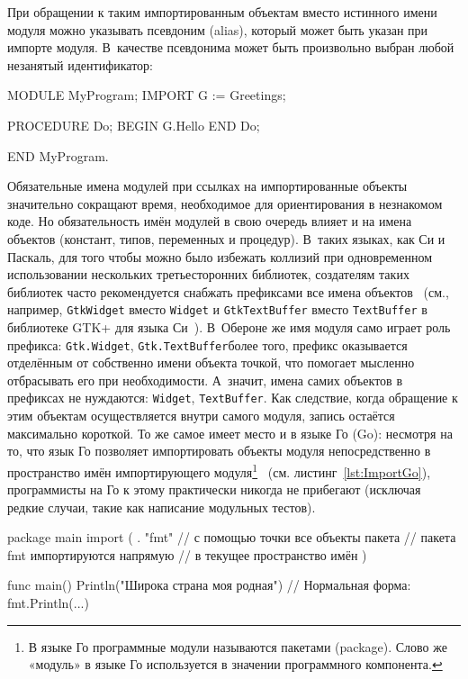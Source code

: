 \documentclass[utf8]{lgu}
\newcommand{\tire}{\unskip\nobreak\thinspace\textemdash\thinspace}
\newcommand{\code}[1]{{\normalsize\texttt{#1}}}
\begin{document}
При обращении к таким импортированным объектам вместо истинного имени модуля можно указывать псевдоним (alias), который может быть указан при импорте модуля. В~качестве псевдонима может быть произвольно выбран любой незанятый идентификатор:

\begin{listing}[H]
\caption{Указание псевдонима при импорте модуля}
\vspace{-17pt}
\begin{modula2}
MODULE MyProgram;
  IMPORT G := Greetings;

  PROCEDURE Do;
  BEGIN
    G.Hello
  END Do;

END MyProgram.
\end{modula2}
\end{listing}

Обязательные имена модулей при ссылках на импортированные объекты значительно сокращают время, необходимое для ориентирования в незнакомом коде. Но обязательность имён модулей в свою очередь влияет и на имена объектов (констант, типов, переменных и процедур). В~таких языках, как Си и Паскаль, для того чтобы можно было избежать коллизий при одновременном использовании нескольких третьесторонних библиотек, создателям таких библиотек часто рекомендуется снабжать префиксами все имена объектов~\cite{Legato} (см., например, \code{GtkWidget} вместо \code{Widget} и \code{GtkTextBuffer} вместо \code{TextBuffer} в библиотеке GTK+ для языка Си~\cite{GtkPlus}). В~Обероне же имя модуля само играет роль префикса: \code{Gtk.Widget}, \code{Gtk.TextBuffer}\tire более того, префикс оказывается отделённым от собственно имени объекта точкой, что помогает мысленно отбрасывать его при необходимости. А~значит, имена самих объектов в префиксах не нуждаются: \code{Widget}, \code{TextBuffer}. Как следствие, когда обращение к этим объектам осуществляется внутри самого модуля, запись остаётся максимально короткой. То же самое имеет место и в языке Го (Go): несмотря на то, что язык Го позволяет импортировать объекты модуля непосредственно в пространство имён импортирующего модуля\footnote{В языке Го программные модули называются пакетами (package). Слово же «модуль» в языке Го используется в значении программного компонента.}~\cite{GoImport} (см. листинг~\ref{lst:ImportGo}), программисты на Го к этому практически никогда не прибегают (исключая редкие случаи, такие как написание модульных тестов).

\begin{listing}[H]
\caption{Импорт всех объектов модуля в текущее пространство имён в языке Го}
\vspace{-17pt}
\label{lst:ImportGo}
\begin{go}
package main
import (
    . "fmt" // с помощью точки все объекты пакета
            // пакета fmt импортируются напрямую
            // в текущее пространство имён
)

func main() {
    Println("Широка страна моя родная")
    // Нормальная форма: fmt.Println(...)
}
\end{go}
\end{listing}
\end{document}
